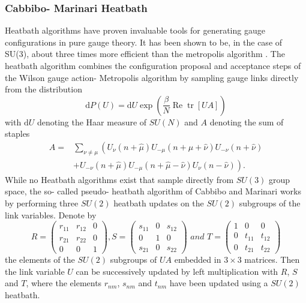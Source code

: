 \documentclass[a4paper,10pt]{article}
\begin{document}
\subsubsection{Cabbibo- Marinari Heatbath}
Heatbath algorithms have proven invaluable tools for generating gauge configurations in pure gauge theory. It has been shown to be, in the case of SU(3), about three times more efficient than the metropolis algorithm \cite{CABIBBO1982387}. The heatbath algorithm combines the configuration proposal and acceptance steps of the Wilson gauge action- Metropolis algorithm by sampling gauge links directly from the distribution
\begin{equation}\label{eq:Heatbath_distribution}
\mathrm{d} P(U)=\mathrm{d} U \exp \left(\frac{\beta}{N} \operatorname{Re} \operatorname{tr}[U A]\right)
\end{equation}
with $\mathrm{d} U$ denoting the Haar measure of $SU(N)$ and $A$ denoting the sum of staples 
\begin{equation}
\begin{aligned}
A=&\sum_{\nu \neq \mu}\left(U_{\nu}(n+\hat{\mu}) U_{-\mu}(n+\hat{\mu}+\hat{\nu}) U_{-\nu}(n+\hat{\nu})\right.\\
&\left.+U_{-\nu}(n+\hat{\mu}) U_{-\mu}(n+\hat{\mu}-\hat{\nu}) U_{\nu}(n-\hat{\nu})\right).
\end{aligned}
\end{equation}
While no Heatbath algorithms exist that sample directly from $SU(3)$ group space, the so- called pseudo- heatbath algorithm of Cabbibo and Marinari \cite{CABIBBO1982387} works by performing three $SU(2)$ heatbath updates on the $SU(2)$ subgroups of the link variables. Denote by 
\begin{equation}\label{eq:SU2_embeddingInSU3}
R=\left(\begin{array}{ccc}
r_{11} & r_{12} & 0 \\
r_{21} & r_{22} & 0 \\
0 & 0 & 1
\end{array}\right), S=\left(\begin{array}{ccc}
s_{11} & 0 & s_{12} \\
0 & 1 & 0 \\
s_{21} & 0 & s_{22}
\end{array}\right)\,\, and\,\, T=\left(\begin{array}{ccc}
1 & 0 & 0 \\
0 & t_{11} & t_{12} \\
0 & t_{21} & t_{22}
\end{array}\right)
\end{equation}
the elements of the $SU(2)$ subgroups of $UA$ embedded in $3\times3$ matrices. Then the link variable $U$ can be successively updated by left multiplication with $R$, $S$ and $T$, where the elements $r_{nm}$, $s_{nm}$ and $t_{nm}$ have been updated using a $SU(2)$ heatbath.
\end{document}
